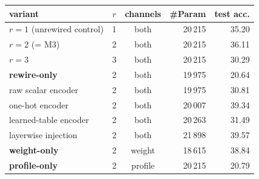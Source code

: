\begin{tabular}{lccrr}
\toprule
variant & $r$ & channels & \#Param & test acc. \\
\midrule
$r{=}1$ (unrewired control) & 1 & both & 20\,215 & 35.20 \\
$r{=}2$ (= M3) & 2 & both & 20\,215 & 36.11 \\
$r{=}3$ & 3 & both & 20\,215 & 30.29 \\
\textbf{rewire-only} & 2 & both & 19\,975 & 20.64 \\
raw scalar encoder & 2 & both & 19\,975 & 30.81 \\
one-hot encoder & 2 & both & 20\,007 & 39.34 \\
learned-table encoder & 2 & both & 20\,263 & 31.49 \\
layerwise injection & 2 & both & 21\,898 & 39.57 \\
\textbf{weight-only} & 2 & weight & 18\,615 & 38.84 \\
\textbf{profile-only} & 2 & profile & 20\,215 & 20.79 \\
\bottomrule
\end{tabular}
